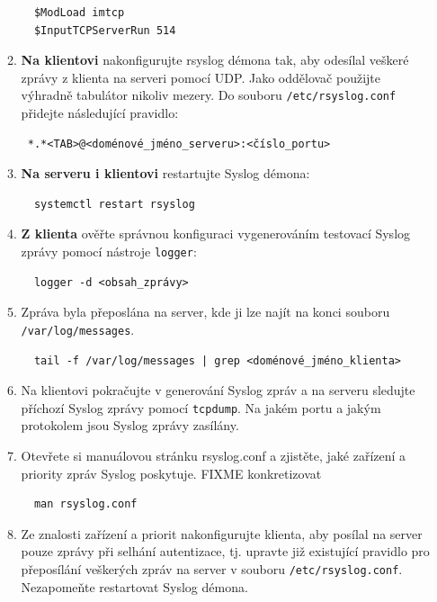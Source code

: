\begin{itemize}
\begin{enumerate}
\begin{verbatim}
  $ModLoad imtcp
  $InputTCPServerRun 514
\end{verbatim} 

            \item {\bf Na klientovi} nakonfigurujte rsyslog démona tak, aby odesílal veškeré zprávy
         z klienta na serveri pomocí UDP. Jako oddělovač použijte výhradně tabulátor nikoliv mezery.
         Do souboru {\tt /etc/rsyslog.conf} přidejte následující pravidlo:
\begin{verbatim} 
 *.*<TAB>@<doménové_jméno_serveru>:<číslo_portu>
\end{verbatim}

            \item {\bf Na serveru i klientovi} restartujte Syslog démona: 
\begin{verbatim}
  systemctl restart rsyslog
\end{verbatim} 

            \item {\bf Z klienta} ověřte správnou konfiguraci vygenerováním testovací Syslog 
         zprávy pomocí nástroje {\tt logger}:
\begin{verbatim} 
  logger -d <obsah_zprávy>
\end{verbatim} 
        
            \item Zpráva byla přeposlána na server, kde ji lze najít na konci souboru
         {\tt /var/log/messages}.

\begin{verbatim} 
  tail -f /var/log/messages | grep <doménové_jméno_klienta>
\end{verbatim} 

            \item  Na klientovi pokračujte v generování Syslog zpráv a 
         na serveru sledujte příchozí Syslog zprávy pomocí {\tt tcpdump}. Na jakém
         portu a jakým protokolem jsou Syslog zprávy zasílány.
         
         

            \item Otevřete si manuálovou stránku rsyslog.conf a zjistěte, jaké zařízení a priority
         zpráv Syslog poskytuje. FIXME konkretizovat
\begin{verbatim} 
  man rsyslog.conf
\end{verbatim} 
        
         \item Ze znalosti zařízení a priorit nakonfigurujte klienta, aby posílal na server 
         pouze zprávy při selhání autentizace, tj. upravte již existující pravidlo pro přeposílání
         veškerých zpráv na server v souboru {\tt /etc/rsyslog.conf}. Nezapomeňte restartovat Syslog démona. 
         

\end{enumerate}
\end{itemize}
